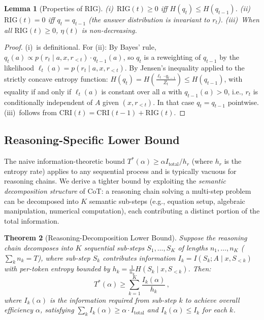 \documentclass{article}
\newtheorem{theorem}{Theorem}
\newtheorem{lemma}[theorem]{Lemma}
\newcommand{\RIG}{\mathrm{RIG}}
\newcommand{\CRI}{\mathrm{CRI}}
\newcommand{\Itotal}{I_{\mathrm{total}}}
\begin{document}
\begin{lemma}[Properties of RIG]
\label{lem:rig_properties}
(i)~$\RIG(t) \geq 0$ iff $H(q_t) \leq H(q_{t-1})$. (ii)~$\RIG(t) = 0$ iff $q_t = q_{t-1}$ (the answer distribution is invariant to $r_t$). (iii)~When all $\RIG(t) \geq 0$, $\eta(t)$ is non-decreasing.
\end{lemma}

\begin{proof}
(i)~is definitional. For (ii): By Bayes' rule, $q_t(a) \propto p(r_t \mid a, x, r_{<t}) \cdot q_{t-1}(a)$, so $q_t$ is a reweighting of $q_{t-1}$ by the likelihood $\ell_t(a) = p(r_t \mid a, x, r_{<t})$. By Jensen's inequality applied to the strictly concave entropy function: $H(q_t) = H\!\left(\frac{\ell_t \cdot q_{t-1}}{Z_t}\right) \leq H(q_{t-1})$, with equality if and only if $\ell_t(a)$ is constant over all $a$ with $q_{t-1}(a) > 0$, i.e., $r_t$ is conditionally independent of $A$ given $(x, r_{<t})$. In that case $q_t = q_{t-1}$ pointwise. (iii)~follows from $\CRI(t) = \CRI(t{-}1) + \RIG(t)$.
\end{proof}

\subsection{Reasoning-Specific Lower Bound}
\label{sec:bound}

The naive information-theoretic bound $T^*(\alpha) \geq \alpha \Itotal / h_r$ (where $h_r$ is the entropy rate) applies to any sequential process and is typically vacuous for reasoning chains. We derive a tighter bound by exploiting the \emph{semantic decomposition structure} of CoT: a reasoning chain solving a multi-step problem can be decomposed into $K$ semantic sub-steps (e.g., equation setup, algebraic manipulation, numerical computation), each contributing a distinct portion of the total information.

\begin{theorem}[Reasoning-Decomposition Lower Bound]
\label{thm:lower_bound}
Suppose the reasoning chain decomposes into $K$ sequential sub-steps $S_1, \ldots, S_K$ of lengths $n_1, \ldots, n_K$ ($\sum_k n_k = T$), where sub-step $S_k$ contributes information $I_k = I(S_k; A \mid x, S_{<k})$ with per-token entropy bounded by $h_k = \frac{1}{n_k}H(S_k \mid x, S_{<k})$. Then:
\begin{equation}
    T^*(\alpha) \geq \sum_{k=1}^{K} \frac{I_k(\alpha)}{h_k}\,,
    \label{eq:lower_bound}
\end{equation}
where $I_k(\alpha)$ is the information required from sub-step $k$ to achieve overall efficiency $\alpha$, satisfying $\sum_k I_k(\alpha) \geq \alpha \cdot \Itotal$ and $I_k(\alpha) \leq I_k$ for each $k$.
\end{theorem}
\end{document}
